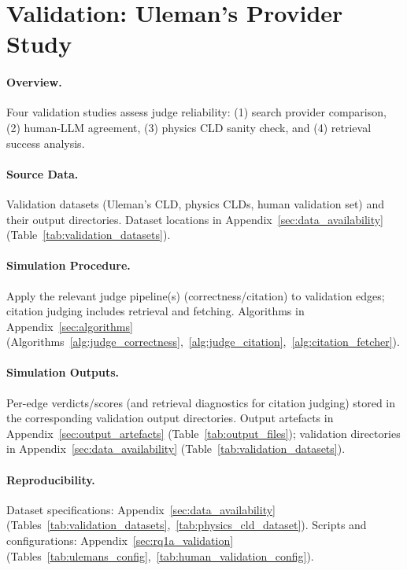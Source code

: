 \section{Validation: Uleman's Provider Study}
\label{sec:rq1a_validation_studies}

\paragraph{Overview.}
Four validation studies assess judge reliability: (1) search provider comparison, (2) human-LLM agreement, (3) physics CLD sanity check, and (4) retrieval success analysis.

\paragraph{Source Data.}
Validation datasets (Uleman's CLD, physics CLDs, human validation set) and their output directories.
Dataset locations in Appendix~\ref{sec:data_availability} (Table~\ref{tab:validation_datasets}).

\paragraph{Simulation Procedure.}
Apply the relevant judge pipeline(s) (correctness/citation) to validation edges; citation judging includes retrieval and fetching.
Algorithms in Appendix~\ref{sec:algorithms} (Algorithms~\ref{alg:judge_correctness},~\ref{alg:judge_citation},~\ref{alg:citation_fetcher}).

\paragraph{Simulation Outputs.}
Per-edge verdicts/scores (and retrieval diagnostics for citation judging) stored in the corresponding validation output directories.
Output artefacts in Appendix~\ref{sec:output_artefacts} (Table~\ref{tab:output_files}); validation directories in Appendix~\ref{sec:data_availability} (Table~\ref{tab:validation_datasets}).

\paragraph{Reproducibility.}
Dataset specifications: Appendix~\ref{sec:data_availability} (Tables~\ref{tab:validation_datasets},~\ref{tab:physics_cld_dataset}). Scripts and configurations: Appendix~\ref{sec:rq1a_validation} (Tables~\ref{tab:ulemans_config},~\ref{tab:human_validation_config}).

